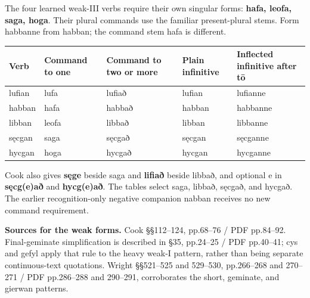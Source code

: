 The four learned weak-III verbs require their own singular forms: \textbf{hafa, leofa, saga, hoga}. Their plural commands use the familiar present-plural stems. Form habbanne from habban; the command stem hafa is different.

\par\begingroup
\fontsize{10.5}{13.2}\selectfont
\setlength{\LTleft}{0pt}\setlength{\LTright}{\fill}
\noindent
\begin{tabular}{@{}>{\raggedright\arraybackslash}p{17.31mm}>{\raggedright\arraybackslash}p{17.57mm}>{\raggedright\arraybackslash}p{23.8mm}>{\raggedright\arraybackslash}p{21.98mm}>{\raggedright\arraybackslash}p{32.1mm}@{}}
\toprule
\textbf{Verb} & \textbf{Command to one} & \textbf{Command to two or more} & \textbf{Plain infinitive} & \textbf{Inflected infinitive after tō} \\
\midrule
lufian & lufa & lufiað & lufian & lufianne \\
habban & hafa & habbað & habban & habbanne \\
libban & leofa & libbað & libban & libbanne \\
sęcgan & saga & sęcgað & sęcgan & sęcganne \\
hycgan & hoga & hycgað & hycgan & hycganne \\
\bottomrule
\end{tabular}
\par\endgroup

Cook also gives \textbf{sęge} beside saga and \textbf{lifiað} beside libbað, and optional e in \textbf{sęcg(e)að} and \textbf{hycg(e)að}. The tables select saga, libbað, sęcgað, and hycgað. The earlier recognition-only negative companion nabban receives no new command requirement.

\textbf{Sources for the weak forms.} Cook §§112–124, pp.68–76 /\allowbreak{} PDF pp.84–92. Final-geminate simplification is described in §35, pp.24–25 /\allowbreak{} PDF pp.40–41; cys and gefyl apply that rule to the heavy weak-I pattern, rather than being separate continuous-text quotations. Wright §§521–525 and 529–530, pp.266–268 and 270–271 /\allowbreak{} PDF pp.286–288 and 290–291, corroborates the short, geminate, and gierwan patterns.

